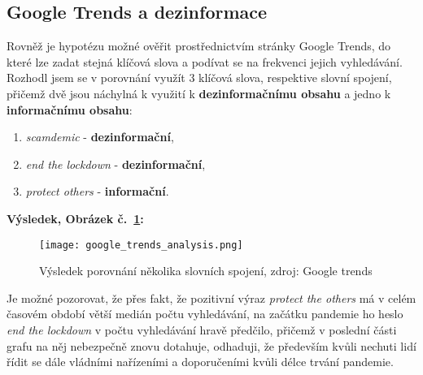 

\subsection{Google Trends a dezinformace}

Rovněž je hypotézu možné ověřit prostřednictvím stránky Google Trends, do které lze zadat stejná klíčová slova a podívat se na frekvenci jejich vyhledávání.\\

Rozhodl jsem se v porovnání využít 3 klíčová slova, respektive slovní spojení, přičemž dvě jsou náchylná k využití k \textbf{dezinformačnímu obsahu} a jedno k \textbf{informačnímu obsahu}:\\

\begin{enumerate}
\item \textit{scamdemic} - \textbf{dezinformační},
\item \textit{end the lockdown} - \textbf{dezinformační},
\item \textit{protect others} - \textbf{informační}.	
\end{enumerate}
\vspace*{5mm}

\newpage

\textbf{Výsledek, Obrázek č.~\ref{fig:google trends}:}

\begin{figure}[htbp]
  \centering
  \texttt{[image: google\_trends\_analysis.png]}
  \caption{Výsledek porovnání několika slovních spojení, zdroj: Google trends}
  \label{fig:google trends}
\end{figure}

Je možné pozorovat, že přes fakt, že pozitivní výraz \textit{protect the others} má v celém časovém období větší medián počtu vyhledávání, na začátku pandemie ho heslo \textit{end the lockdown} v počtu vyhledávání hravě předčilo, přičemž v poslední části grafu na něj nebezpečně znovu dotahuje, odhaduji, že především kvůli nechuti lidí řídit se dále vládními nařízeními a doporučeními kvůli délce trvání pandemie.\\

